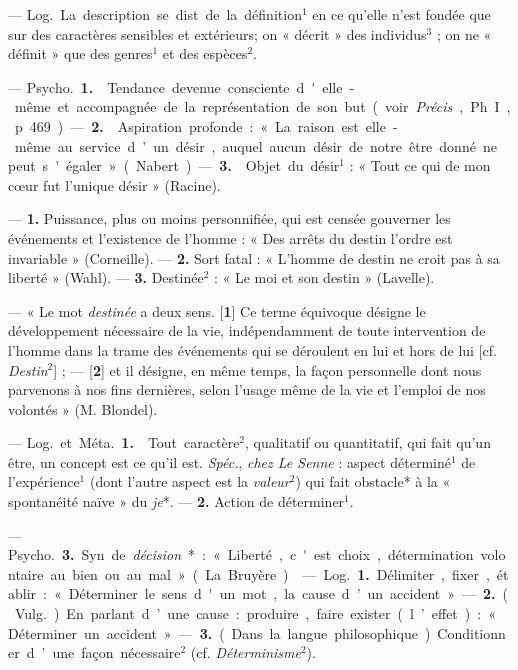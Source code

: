 \begin{itemize}[leftmargin=1cm, label=, itemsep=1pt]
 — \si{Log.} La description
se dist. de la définition$^1$ en ce qu’elle
n’est fondée que sur des caractères
sensibles et extérieurs; on « décrit »
des individus$^3$ ; on ne « définit » que
des genres$^1$ et des espèces$^2$.

 — \si{Psycho.} {\bf 1.}  Tendance devenue consciente d'elle-même et
accompagnée de la représentation
de son but (voir  {\it Précis}, Ph. I, p. 469).
— {\bf 2.}  Aspiration profonde : « La
raison est elle-même au service d’un
désir, auquel aucun désir de notre
être donné ne peut s'égaler » (Nabert). — {\bf 3.}  Objet du désir$^1$ : « Tout
ce qui de mon cœur fut l’unique
désir » (Racine).

 — {\bf 1.} Puissance, plus ou moins
personnifiée, qui est censée gouverner les événements et l'existence de
l'homme : « Des arrêts du destin
l’ordre est invariable » (Corneille). —
 {\bf 2.} Sort fatal : « L'homme de destin
ne croit pas à sa liberté » (Wahl). —
 {\bf 3.} Destinée$^2$ : « Le moi et son destin »
(Lavelle).

 — « Le mot {\it destinée} a deux
sens. [{\bf 1}] Ce terme équivoque désigne le développement nécessaire
de la vie, indépendamment de toute
intervention de l’homme dans la
trame des événements qui se déroulent en lui et hors de lui [cf. {\it Destin}$^2$] ;
— [{\bf 2}] et il désigne, en même temps,
la façon personnelle dont nous parvenons à nos fins dernières, selon
l'usage même de la vie et l'emploi
de nos volontés » (M. Blondel).

 — \si{Log.} et \si{Méta.} {\bf 1.}
 Tout caractère$^2$, qualitatif ou quantitatif, qui fait qu'un être, un concept est ce qu'il est. {\it Spéc.}, {\it chez Le
Senne} : aspect déterminé$^1$ de l’expérience$^1$ (dont l’autre aspect est la
{\it valeur}$^2$) qui fait obstacle* à la
« spontanéité naïve » du {\it je}*. —
 {\bf 2.}  Action de déterminer$^1$.

— \si{Psycho.} {\bf 3.} Syn. de {\it décision}* :
« Liberté, c'est choix, détermination volontaire au bien ou au mal »
(La Bruyère).

 — \si{Log.} {\bf 1.} Délimiter,
fixer, établir : « Déterminer le sens
d'un mot, la cause d’un accident ».
— {\bf 2.} (\si{Vulg.}). En parlant d’une
cause : produire, faire exister
(l’effet) : « Déterminer un accident ».
— {\bf 3.} (Dans la langue philosophique). Conditionner d’une façon nécessaire$^2$ (cf. {\it Déterminisme}$^2$).


\end{itemize}
